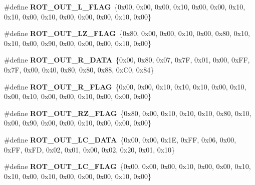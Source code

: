 \begin{DoxyCompactItemize}
\item 
\mbox{\label{unit-test-cpu-dispatch_8c_a0e3a94117a21f48e0f1cd06baaffddfc}} 
\#define {\bfseries R\+O\+T\+\_\+\+O\+U\+T\+\_\+\+L\+\_\+\+F\+L\+AG}~\{0x00, 0x00, 0x00, 0x10, 0x00, 0x00, 0x10, 0x10, 0x00, 0x10, 0x00, 0x00, 0x00, 0x10, 0x00\}
\item 
\mbox{\label{unit-test-cpu-dispatch_8c_a419055a8e5762a8b7ff5a71eba09fc13}} 
\#define {\bfseries R\+O\+T\+\_\+\+O\+U\+T\+\_\+\+L\+Z\+\_\+\+F\+L\+AG}~\{0x80, 0x00, 0x00, 0x10, 0x00, 0x80, 0x10, 0x10, 0x00, 0x90, 0x00, 0x00, 0x00, 0x10, 0x00\}
\item 
\mbox{\label{unit-test-cpu-dispatch_8c_a249af367bbd32a0993c593cc2c991217}} 
\#define {\bfseries R\+O\+T\+\_\+\+O\+U\+T\+\_\+\+R\+\_\+\+D\+A\+TA}~\{0x00, 0x80, 0x07, 0x7\+F, 0x01, 0x00, 0x\+F\+F, 0x7\+F, 0x00, 0x40, 0x80, 0x80, 0x88, 0x\+C0, 0x84\}
\item 
\mbox{\label{unit-test-cpu-dispatch_8c_a6664545e08d920195e3cf443fd21e634}} 
\#define {\bfseries R\+O\+T\+\_\+\+O\+U\+T\+\_\+\+R\+\_\+\+F\+L\+AG}~\{0x00, 0x00, 0x10, 0x10, 0x10, 0x00, 0x10, 0x00, 0x10, 0x00, 0x00, 0x10, 0x00, 0x00, 0x00\}
\item 
\mbox{\label{unit-test-cpu-dispatch_8c_a213e9fd62d79000ca472d3528f144c4f}} 
\#define {\bfseries R\+O\+T\+\_\+\+O\+U\+T\+\_\+\+R\+Z\+\_\+\+F\+L\+AG}~\{0x80, 0x00, 0x10, 0x10, 0x10, 0x80, 0x10, 0x00, 0x90, 0x00, 0x00, 0x10, 0x00, 0x00, 0x00\}
\item 
\mbox{\label{unit-test-cpu-dispatch_8c_a3711f2a77c7cf5732a366c4068d7fdad}} 
\#define {\bfseries R\+O\+T\+\_\+\+O\+U\+T\+\_\+\+L\+C\+\_\+\+D\+A\+TA}~\{0x00, 0x00, 0x1\+E, 0x\+F\+F, 0x06, 0x00, 0x\+F\+F, 0x\+F\+D, 0x02, 0x01, 0x00, 0x02, 0x20, 0x01, 0x10\}
\item 
\mbox{\label{unit-test-cpu-dispatch_8c_ab5ee565c1df5d066e4d54b4f2c9c156a}} 
\#define {\bfseries R\+O\+T\+\_\+\+O\+U\+T\+\_\+\+L\+C\+\_\+\+F\+L\+AG}~\{0x00, 0x00, 0x00, 0x10, 0x00, 0x00, 0x10, 0x10, 0x00, 0x10, 0x00, 0x00, 0x00, 0x10, 0x00\}
\item 
\mbox{\label{unit-test-cpu-dispatch_8c_ae27a518a53cbc4c7702f89f664faa8e8}} 

\end{DoxyCompactItemize}
